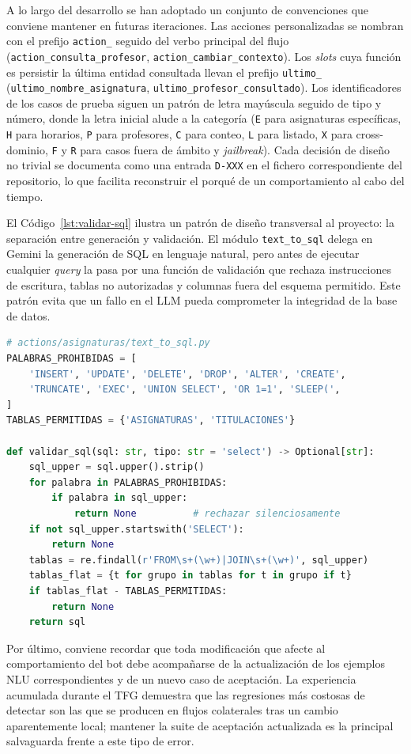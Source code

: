A lo largo del desarrollo se han adoptado un conjunto de convenciones que conviene mantener en futuras iteraciones. Las acciones personalizadas se nombran con el prefijo \texttt{action\_} seguido del verbo principal del flujo (\texttt{action\_consulta\_profesor}, \texttt{action\_cambiar\_contexto}). Los \textit{slots} cuya función es persistir la última entidad consultada llevan el prefijo \texttt{ultimo\_} (\texttt{ultimo\_nombre\_asignatura}, \texttt{ultimo\_profesor\_consultado}). Los identificadores de los casos de prueba siguen un patrón de letra mayúscula seguido de tipo y número, donde la letra inicial alude a la categoría (\texttt{E} para asignaturas específicas, \texttt{H} para horarios, \texttt{P} para profesores, \texttt{C} para conteo, \texttt{L} para listado, \texttt{X} para cross-dominio, \texttt{F} y \texttt{R} para casos fuera de ámbito y \textit{jailbreak}). Cada decisión de diseño no trivial se documenta como una entrada \texttt{D-XXX} en el fichero correspondiente del repositorio, lo que facilita reconstruir el porqué de un comportamiento al cabo del tiempo.

El Código~\ref{lst:validar-sql} ilustra un patrón de diseño transversal al proyecto: la separación entre generación y validación. El módulo \texttt{text\_to\_sql} delega en Gemini la generación de SQL en lenguaje natural, pero antes de ejecutar cualquier \textit{query} la pasa por una función de validación que rechaza instrucciones de escritura, tablas no autorizadas y columnas fuera del esquema permitido. Este patrón evita que un fallo en el LLM pueda comprometer la integridad de la base de datos.

\begin{lstlisting}[language=python, caption={Fragmento de \texttt{validar\_sql}: lista de palabras prohibidas y verificacion de tabla.}, label={lst:validar-sql}]
# actions/asignaturas/text_to_sql.py
PALABRAS_PROHIBIDAS = [
    'INSERT', 'UPDATE', 'DELETE', 'DROP', 'ALTER', 'CREATE',
    'TRUNCATE', 'EXEC', 'UNION SELECT', 'OR 1=1', 'SLEEP(',
]
TABLAS_PERMITIDAS = {'ASIGNATURAS', 'TITULACIONES'}

def validar_sql(sql: str, tipo: str = 'select') -> Optional[str]:
    sql_upper = sql.upper().strip()
    for palabra in PALABRAS_PROHIBIDAS:
        if palabra in sql_upper:
            return None          # rechazar silenciosamente
    if not sql_upper.startswith('SELECT'):
        return None
    tablas = re.findall(r'FROM\s+(\w+)|JOIN\s+(\w+)', sql_upper)
    tablas_flat = {t for grupo in tablas for t in grupo if t}
    if tablas_flat - TABLAS_PERMITIDAS:
        return None
    return sql
\end{lstlisting}

Por último, conviene recordar que toda modificación que afecte al comportamiento del bot debe acompañarse de la actualización de los ejemplos NLU correspondientes y de un nuevo caso de aceptación. La experiencia acumulada durante el TFG demuestra que las regresiones más costosas de detectar son las que se producen en flujos colaterales tras un cambio aparentemente local; mantener la suite de aceptación actualizada es la principal salvaguarda frente a este tipo de error.
